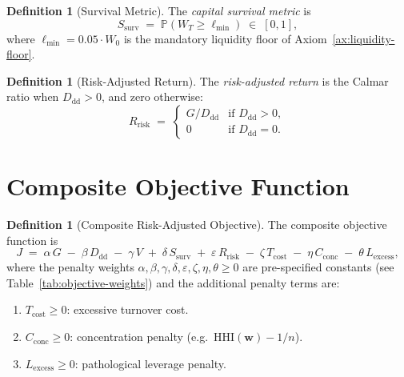 \documentclass[12pt,openany]{book}
\newcommand{\bfw}{\mathbf{w}}
\newcommand{\Prob}{\mathbb{P}}
\numberwithin{equation}{chapter}
\theoremstyle{plain}
\theoremstyle{definition}
\newtheorem{definition}[theorem]{Definition}
\theoremstyle{remark}
\numberwithin{equation}{chapter}
\theoremstyle{plain}
\begin{document}
\begin{definition}[Survival Metric]
\label{def:survival}
The \emph{capital survival metric} is
\begin{equation}
  S_{\mathrm{surv}} \;=\; \Prob\!\left(W_T \geq \ell_{\min}\right)
  \;\in\; [0,1],
  \label{eq:survival}
\end{equation}
where $\ell_{\min} = 0.05 \cdot W_0$ is the mandatory liquidity floor
of Axiom~\ref{ax:liquidity-floor}.
\end{definition}

\begin{definition}[Risk-Adjusted Return]
\label{def:risk-adj-return}
The \emph{risk-adjusted return} is the Calmar ratio when
$D_{\mathrm{dd}} > 0$, and zero otherwise:
\begin{equation}
  R_{\mathrm{risk}}
  \;=\;
  \begin{cases}
    G / D_{\mathrm{dd}} & \text{if } D_{\mathrm{dd}} > 0, \\
    0 & \text{if } D_{\mathrm{dd}} = 0.
  \end{cases}
  \label{eq:risk-adj-return}
\end{equation}
\end{definition}

\section{Composite Objective Function}

\begin{definition}[Composite Risk-Adjusted Objective]
\label{def:composite-objective}
The composite objective function is
\begin{equation}
  J \;=\; \alpha\,G \;-\; \beta\,D_{\mathrm{dd}} \;-\; \gamma\,V
         \;+\; \delta\,S_{\mathrm{surv}} \;+\; \varepsilon\,R_{\mathrm{risk}}
         \;-\; \zeta\,T_{\mathrm{cost}} \;-\; \eta\,C_{\mathrm{conc}}
         \;-\; \theta\,L_{\mathrm{excess}},
  \label{eq:composite-objective}
\end{equation}
where the penalty weights $\alpha,\beta,\gamma,\delta,\varepsilon,
\zeta,\eta,\theta \geq 0$ are pre-specified constants (see
Table~\ref{tab:objective-weights}) and the additional penalty terms are:
\begin{enumerate}
  \item $T_{\mathrm{cost}} \geq 0$: excessive turnover cost.
  \item $C_{\mathrm{conc}} \geq 0$: concentration penalty
        (e.g.\ $\mathrm{HHI}(\bfw) - 1/n$).
  \item $L_{\mathrm{excess}} \geq 0$: pathological leverage penalty.
\end{enumerate}
\end{definition}
\end{document}
